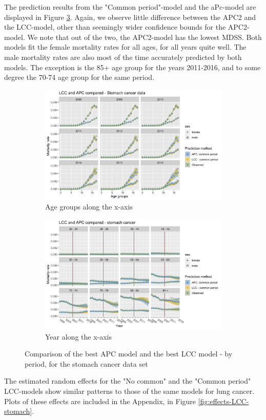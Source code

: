 \newpar The prediction results from the "Common period"-model and the aPc-model are displayed in Figure \ref{fig:mv-LCC-APC-stomach}. Again, we observe little difference between the APC2 and the LCC-model, other than seemingly wider confidence bounds for the APC2-model. We note that out of the two, the APC2-model has the lowest MDSS. Both models fit the female mortality rates for all ages, for all years quite well. The male mortality rates are also most of the time accurately predicted by both models. The exception is the 85+ age group for the years 2011-2016, and to some degree the 70-74 age group for the same period.

\begin{figure}
    \centering
    \begin{subfigure}[b]{.6\linewidth}
        \includegraphics[width=\linewidth]{real-data/real-data-multivariate/Figures/multivariate-comparison-by-age-stomach.png}
        \caption{Age groups along the x-axis}
        \label{fig:mv-LCC-APC-stomach-top}
    \end{subfigure}
    
    \begin{subfigure}[b]{.6\linewidth}
        \includegraphics[width=\linewidth]{real-data/real-data-multivariate/Figures/multivariate-comparison-by-period-stomach.png}
        \caption{Year along the x-axis}
        \label{fig:mv-LCC-APC-stomach-bottom}
    \end{subfigure}
    \caption{Comparison of the best APC model and the best LCC model - by period, for the stomach cancer data set}
    \label{fig:mv-LCC-APC-stomach}
\end{figure}

\newpar The estimated random effects for the "No common" and the "Common period" LCC-models show similar patterns to those of the same models for lung cancer. Plots of these effects are included in the Appendix, in Figure \ref{fig:effects-LCC-stomach}.

